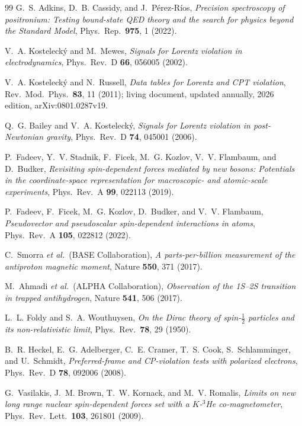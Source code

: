 \documentclass[12pt,a4paper]{report}
\begin{document}
\begin{thebibliography}{99}
G.~S. Adkins, D.~B. Cassidy, and J.~P\'{e}rez-R\'{i}os,
\textit{Precision spectroscopy of positronium: Testing bound-state QED
theory and the search for physics beyond the Standard Model},
Phys.\ Rep.\ \textbf{975}, 1 (2022).

V.~A. Kosteleck\'{y} and M.~Mewes,
\textit{Signals for Lorentz violation in electrodynamics},
Phys.\ Rev.\ D \textbf{66}, 056005 (2002).

V.~A. Kosteleck\'{y} and N.~Russell,
\textit{Data tables for Lorentz and CPT violation},
Rev.\ Mod.\ Phys.\ \textbf{83}, 11 (2011); living document, updated annually,
2026 edition, arXiv:0801.0287v19.

Q.~G. Bailey and V.~A. Kosteleck\'{y},
\textit{Signals for Lorentz violation in post-Newtonian gravity},
Phys.\ Rev.\ D \textbf{74}, 045001 (2006).

P.~Fadeev, Y.~V. Stadnik, F.~Ficek, M.~G. Kozlov, V.~V. Flambaum, and
D.~Budker,
\textit{Revisiting spin-dependent forces mediated by new bosons: Potentials in
the coordinate-space representation for macroscopic- and atomic-scale
experiments},
Phys.\ Rev.\ A \textbf{99}, 022113 (2019).

P.~Fadeev, F.~Ficek, M.~G. Kozlov, D.~Budker, and V.~V. Flambaum,
\textit{Pseudovector and pseudoscalar spin-dependent interactions in atoms},
Phys.\ Rev.\ A \textbf{105}, 022812 (2022).

C.~Smorra \textit{et al.}\ (BASE Collaboration),
\textit{A parts-per-billion measurement of the antiproton magnetic moment},
Nature \textbf{550}, 371 (2017).

M.~Ahmadi \textit{et al.}\ (ALPHA Collaboration),
\textit{Observation of the 1S--2S transition in trapped antihydrogen},
Nature \textbf{541}, 506 (2017).

L.~L. Foldy and S.~A. Wouthuysen,
\textit{On the Dirac theory of spin-$\frac{1}{2}$ particles and its
non-relativistic limit},
Phys.\ Rev.\ \textbf{78}, 29 (1950).

B.~R. Heckel, E.~G. Adelberger, C.~E. Cramer, T.~S. Cook, S.~Schlamminger,
and U.~Schmidt,
\textit{Preferred-frame and CP-violation tests with polarized electrons},
Phys.\ Rev.\ D \textbf{78}, 092006 (2008).

G.~Vasilakis, J.~M. Brown, T.~W. Kornack, and M.~V. Romalis,
\textit{Limits on new long range nuclear spin-dependent forces set with a
$K$-$^{3}$He co-magnetometer},
Phys.\ Rev.\ Lett.\ \textbf{103}, 261801 (2009).


\end{thebibliography}
\end{document}
